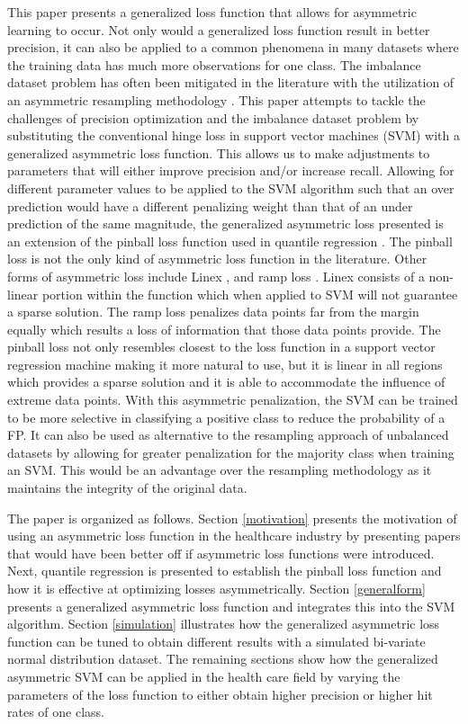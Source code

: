 \documentclass[twoside,11pt]{article}
\begin{document}
This paper presents a generalized loss function that allows for asymmetric learning to occur. Not only would a generalized loss function result in better precision, it can also be applied to a common phenomena in many datasets where the training data has much more observations for one class. The imbalance dataset problem has often been mitigated in the literature with the utilization of an asymmetric resampling methodology \citep{Hamed04}. This paper attempts to tackle the challenges of precision optimization and the imbalance dataset problem by substituting the conventional hinge loss in support vector machines (SVM) with a generalized asymmetric loss function. This allows us to make adjustments to parameters that will either improve precision and/or increase recall. Allowing for different parameter values to be applied to the SVM algorithm such that an over prediction would have a different penalizing weight than that of an under prediction of the same magnitude, the generalized asymmetric loss presented is an extension of the pinball loss function \citet{Koenker01} used in quantile regression \citep{Steinwart07}. The pinball loss is not the only kind of asymmetric loss function in the literature. Other forms of asymmetric loss include Linex \citep{Demetrescu07} \citep{Ohtani95}, and ramp loss \citep{Takeuchi06}. Linex consists of a non-linear portion within the function which when applied to SVM will not guarantee a sparse solution. The ramp loss penalizes data points far from the margin equally which results a loss of information that those data points provide. The pinball loss not only resembles closest to the loss function in a support vector regression machine making it more natural to use, but it is linear in all regions which provides a sparse solution and it is able to accommodate the influence of extreme data points. With this asymmetric penalization, the SVM can be trained to be more selective in classifying a positive class to reduce the probability of a FP. It can also be used as alternative to the resampling approach of unbalanced datasets by allowing for greater penalization for the majority class when training an SVM. This would be an advantage over the resampling methodology as it maintains the integrity of the original data.

The paper is organized as follows. Section \ref{motivation} presents the motivation of using an asymmetric loss function in the healthcare industry by presenting papers that would have been better off if asymmetric loss functions were introduced. Next, quantile regression is presented to establish the pinball loss function and how it is effective at optimizing losses asymmetrically. Section \ref{generalform} presents a generalized asymmetric loss function and integrates this into the SVM algorithm. Section \ref{simulation} illustrates how the generalized asymmetric loss function can be tuned to obtain different results with a simulated bi-variate normal distribution dataset. The remaining sections show how the generalized asymmetric SVM can be applied in the health care field by varying the parameters of the loss function to either obtain higher precision or higher hit rates of one class.
\end{document}

